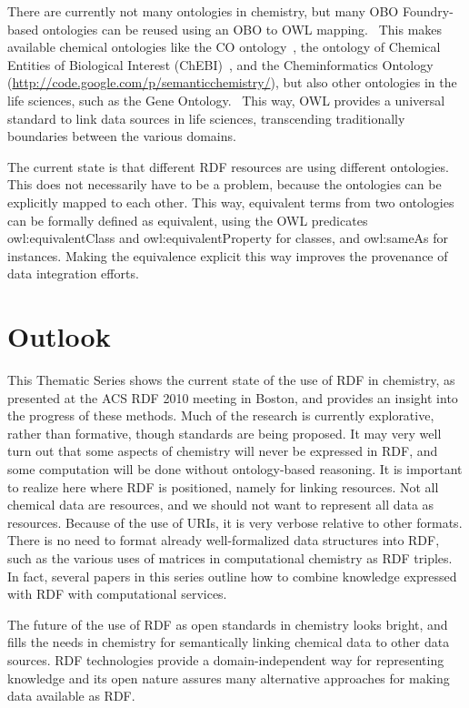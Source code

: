 \documentclass[10pt]{bmc_article}
\newenvironment{bmcformat}{\begin{raggedright}\baselineskip20pt\sloppy\setboolean{publ}{false}}{\end{raggedright}\baselineskip20pt\sloppy}
\begin{document}
\begin{bmcformat}
There are currently not many ontologies in chemistry, but many OBO Foundry-based
ontologies can be reused using an OBO to OWL mapping.~\cite{Moreira2007} This makes
available chemical ontologies like the CO ontology~\cite{Feldman2005},
the ontology of Chemical Entities of Biological Interest (ChEBI)~\cite{Degtyarenko2008,Hull2008},
and the Cheminformatics Ontology (\url{http://code.google.com/p/semanticchemistry/}),
but also other ontologies in the life sciences, such as the Gene Ontology.~\cite{Aranguren2007}
This way, OWL provides a universal standard to link data sources in life
sciences, transcending traditionally boundaries between the various domains.

The current state is that different RDF resources are using different ontologies.
This does not necessarily have to be a problem, because the ontologies can be
explicitly mapped to each other. This way, equivalent terms from two ontologies
can be formally defined as equivalent, using the OWL predicates owl:equivalentClass
and owl:equivalentProperty for classes, and owl:sameAs for instances.
Making the equivalence explicit this way improves the provenance of data integration efforts. 

\section{Outlook}

This Thematic Series shows the current state of the use of RDF in
chemistry, as presented at the ACS RDF 2010 meeting in Boston, and provides an
insight into the progress of these methods. Much of the research is currently explorative,
rather than formative, though standards are being proposed. 
It may very well turn out that some aspects of chemistry will never be expressed
in RDF, and some computation will be done without ontology-based reasoning. It is important
to realize here where RDF is positioned, namely for linking resources.
Not all chemical data are resources, and we should not want to represent
all data as resources.
Because of the use of URIs, it is very verbose relative to other formats.
There is no need to format already well-formalized data structures into
RDF, such as the various uses of matrices in computational chemistry as
RDF triples. In fact, several papers in this series outline how to
combine knowledge expressed with RDF with computational services.

The future of the use of RDF as open standards in chemistry looks
bright, and fills the needs in chemistry for semantically linking
chemical data to other data sources. RDF technologies provide a
domain-independent way for representing knowledge and its open
nature assures many alternative approaches for making data available
as RDF.


\end{bmcformat}
\end{document}
